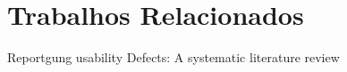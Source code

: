 \chapter{Trabalhos Relacionados}
\label{cap:trabalhos-relacionados}


Reportgung usability Defects: A systematic literature review